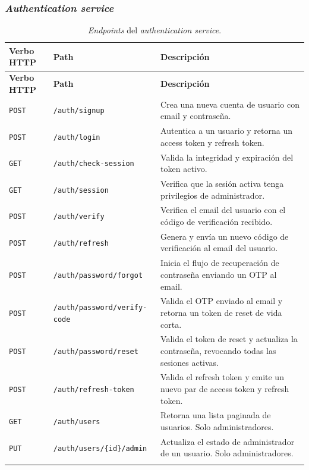 \subsubsection{\textit{Authentication service}}

\renewcommand{\arraystretch}{1.4}
\begin{longtable}{|p{2cm}|p{7cm}|p{5.5cm}|}
\hline
\textbf{Verbo HTTP} & \textbf{Path} & \textbf{Descripción} \\
\hline
\endfirsthead

\hline
\textbf{Verbo HTTP} & \textbf{Path} & \textbf{Descripción} \\
\hline
\endhead

\endfoot

\texttt{POST} & \texttt{/auth/signup}               & Crea una nueva cuenta de usuario con email y contraseña. \\
\hline
\texttt{POST} & \texttt{/auth/login}                & Autentica a un usuario y retorna un access token y refresh token. \\
\hline
\texttt{GET}  & \texttt{/auth/check-session}        & Valida la integridad y expiración del token activo. \\
\hline
\texttt{GET}  & \texttt{/auth/session}              & Verifica que la sesión activa tenga privilegios de administrador. \\
\hline
\texttt{POST} & \texttt{/auth/verify}               & Verifica el email del usuario con el código de verificación recibido. \\
\hline
\texttt{POST} & \texttt{/auth/refresh}              & Genera y envía un nuevo código de verificación al email del usuario. \\
\hline
\texttt{POST} & \texttt{/auth/password/forgot}      & Inicia el flujo de recuperación de contraseña enviando un OTP al email. \\
\hline
\texttt{POST} & \texttt{/auth/password/verify-code} & Valida el OTP enviado al email y retorna un token de reset de vida corta. \\
\hline
\texttt{POST} & \texttt{/auth/password/reset}       & Valida el token de reset y actualiza la contraseña, revocando todas las sesiones activas. \\
\hline
\texttt{POST} & \texttt{/auth/refresh-token}        & Valida el refresh token y emite un nuevo par de access token y refresh token. \\
\hline
\texttt{GET}  & \texttt{/auth/users}                & Retorna una lista paginada de usuarios. Solo administradores. \\
\hline
\texttt{PUT}  & \texttt{/auth/users/\{id\}/admin}   & Actualiza el estado de administrador de un usuario. Solo administradores. \\
\hline
\caption{\textit{Endpoints} del \textit{authentication service}.}\label{tab:auth-endpoints}
\end{longtable}
